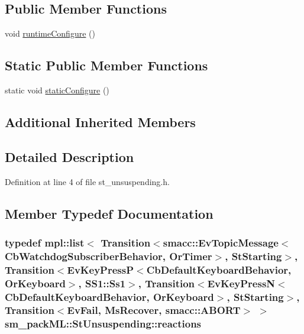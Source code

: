 \subsection*{Public Member Functions}
\begin{DoxyCompactItemize}
\item 
void \hyperlink{structsm__packML_1_1StUnsuspending_acd61f286c4c4378cc207d7e52bb7e373}{runtime\+Configure} ()
\end{DoxyCompactItemize}
\subsection*{Static Public Member Functions}
\begin{DoxyCompactItemize}
\item 
static void \hyperlink{structsm__packML_1_1StUnsuspending_a1d0786e13bbfe99d470bed2ff98874ec}{static\+Configure} ()
\end{DoxyCompactItemize}
\subsection*{Additional Inherited Members}


\subsection{Detailed Description}


Definition at line 4 of file st\+\_\+unsuspending.\+h.



\subsection{Member Typedef Documentation}
\subsubsection[{\texorpdfstring{reactions}{reactions}}]{\setlength{\rightskip}{0pt plus 5cm}typedef mpl\+::list$<$ Transition$<${\bf smacc\+::\+Ev\+Topic\+Message}$<${\bf Cb\+Watchdog\+Subscriber\+Behavior}, {\bf Or\+Timer}$>$, {\bf St\+Starting}$>$, Transition$<$Ev\+Key\+PressP$<$Cb\+Default\+Keyboard\+Behavior, {\bf Or\+Keyboard}$>$, {\bf S\+S1\+::\+Ss1}$>$, Transition$<$Ev\+Key\+PressN$<$Cb\+Default\+Keyboard\+Behavior, {\bf Or\+Keyboard}$>$, {\bf St\+Starting}$>$, Transition$<${\bf Ev\+Fail}, {\bf Ms\+Recover}, {\bf smacc\+::\+A\+B\+O\+RT}$>$ $>$ {\bf sm\+\_\+pack\+M\+L\+::\+St\+Unsuspending\+::reactions}}\hypertarget{structsm__packML_1_1StUnsuspending_a11837ff479a94ef761b8c42f5ebb8f7d}{}\label{structsm__packML_1_1StUnsuspending_a11837ff479a94ef761b8c42f5ebb8f7d}


